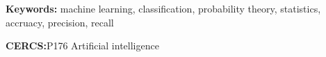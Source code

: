 \noindent\textbf{Keywords:} machine learning, classification, probability theory, statistics, accruacy, precision, recall
\vspace*{1ex}

\noindent\textbf{CERCS:}P176 Artificial intelligence
\vspace*{1ex}

